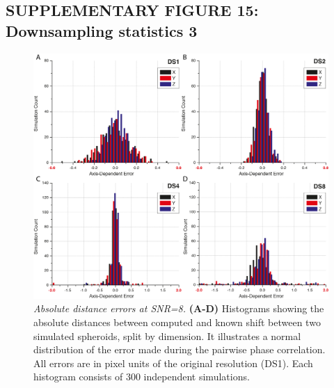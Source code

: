 \documentclass[]{spie}  %
\begin{document}
\pagebreak

\subsection*{SUPPLEMENTARY FIGURE 15: Downsampling statistics 3}
\vspace{1mm}
\begin{figure}[h!]
\includegraphics[width=\textwidth]{fig-downsampling-statistics-2.png}
\vspace{-2.0mm}
\caption{\hspace{-0.5mm} \emph{Absolute distance errors at SNR=8.} \textbf{(A-D)}  Histograms showing the absolute distances between computed and known shift between two simulated spheroids, split by dimension. It illustrates a normal distribution of the error made during the pairwise phase correlation. All errors are in pixel units of the original resolution (DS1). Each histogram consists of 300 independent simulations.
}
\label{fig:sup-fig-downsampling-statistics-2}
\end{figure}

\pagebreak
\end{document}
